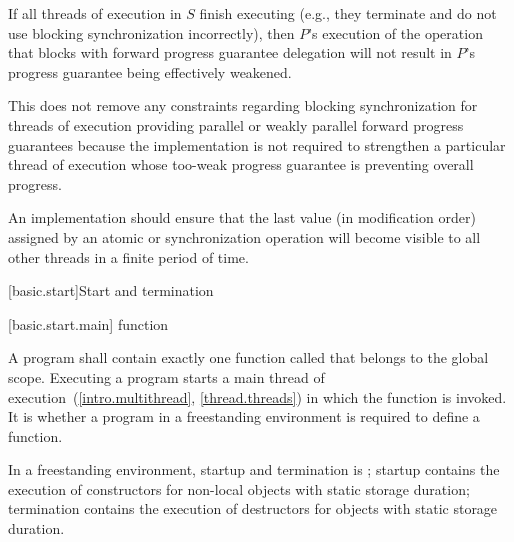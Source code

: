 \pnum
\begin{note}
If all threads of execution in $S$ finish executing (e.g., they terminate
and do not use blocking synchronization incorrectly), then $P$'s execution
of the operation that blocks with forward progress guarantee delegation will not
result in $P$'s progress guarantee being effectively weakened.
\end{note}

\pnum
\begin{note}
This does not remove any constraints regarding blocking synchronization for
threads of execution providing parallel or weakly parallel forward progress
guarantees because the implementation is not required to strengthen a particular
thread of execution whose too-weak progress guarantee is preventing overall progress.
\end{note}

\pnum
An implementation should ensure that the last value (in modification order)
assigned by an atomic or synchronization operation will become visible to all
other threads in a finite period of time.%
%

[basic.start]{Start and termination}

[basic.start.main]{ function}

\pnum
{}%
A program shall contain exactly one function called 
that belongs to the global scope.
Executing a program starts a main thread of execution~(\ref{intro.multithread}, \ref{thread.threads})
in which the  function is invoked.
%
It is 
whether a program in a freestanding environment is required to define a 
function.
\begin{note}
In a freestanding environment, startup and termination is
; startup contains the
execution of constructors for non-local objects with static storage duration;
termination contains the execution of destructors for objects with static storage
duration.
\end{note}

